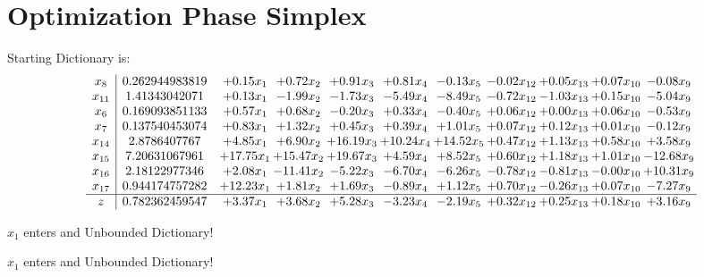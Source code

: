 \documentclass[9pt]{article}
\begin{document}
\section{Optimization Phase Simplex}
Starting Dictionary is:
\[\begin{array}{c| c c@{\hskip 2pt} c@{\hskip 2pt} c@{\hskip 2pt} c@{\hskip 2pt} c@{\hskip 2pt} c@{\hskip 2pt} c@{\hskip 2pt} c@{\hskip 2pt} c@{\hskip 2pt} }
 x_{8}   &  0.262944983819 & +  0.15 x_{1} & +  0.72 x_{2} & +  0.91 x_{3} & +  0.81 x_{4} & -0.13 x_{5} & -0.02 x_{12} & +  0.05 x_{13} & +  0.07 x_{10} & -0.08 x_{9}\\
 x_{11}   &  1.41343042071 & +  0.13 x_{1} & -1.99 x_{2} & -1.73 x_{3} & -5.49 x_{4} & -8.49 x_{5} & -0.72 x_{12} & -1.03 x_{13} & +  0.15 x_{10} & -5.04 x_{9}\\
 x_{6}   &  0.169093851133 & +  0.57 x_{1} & +  0.68 x_{2} & -0.20 x_{3} & +  0.33 x_{4} & -0.40 x_{5} & +  0.06 x_{12} & +  0.00 x_{13} & +  0.06 x_{10} & -0.53 x_{9}\\
 x_{7}   &  0.137540453074 & +  0.83 x_{1} & +  1.32 x_{2} & +  0.45 x_{3} & +  0.39 x_{4} & +  1.01 x_{5} & +  0.07 x_{12} & +  0.12 x_{13} & +  0.01 x_{10} & -0.12 x_{9}\\
 x_{14}   &  2.8786407767 & +  4.85 x_{1} & +  6.90 x_{2} & + 16.19 x_{3} & + 10.24 x_{4} & + 14.52 x_{5} & +  0.47 x_{12} & +  1.13 x_{13} & +  0.58 x_{10} & +  3.58 x_{9}\\
 x_{15}   &  7.20631067961 & + 17.75 x_{1} & + 15.47 x_{2} & + 19.67 x_{3} & +  4.59 x_{4} & +  8.52 x_{5} & +  0.60 x_{12} & +  1.18 x_{13} & +  1.01 x_{10} & -12.68 x_{9}\\
 x_{16}   &  2.18122977346 & +  2.08 x_{1} & -11.41 x_{2} & -5.22 x_{3} & -6.70 x_{4} & -6.26 x_{5} & -0.78 x_{12} & -0.81 x_{13} & -0.00 x_{10} & + 10.31 x_{9}\\
 x_{17}   &  0.944174757282 & + 12.23 x_{1} & +  1.81 x_{2} & +  1.69 x_{3} & -0.89 x_{4} & +  1.12 x_{5} & +  0.70 x_{12} & -0.26 x_{13} & +  0.07 x_{10} & -7.27 x_{9}\\
\hline
z    &  0.782362459547 & +  3.37 x_{1} & +  3.68 x_{2} & +  5.28 x_{3} & -3.23 x_{4} & -2.19 x_{5} & +  0.32 x_{12} & +  0.25 x_{13} & +  0.18 x_{10} & +  3.16 x_{9}\\
\end{array}\]


 $ x_{1} $ enters and Unbounded Dictionary!


 $ x_{1} $ enters and Unbounded Dictionary!
\end{document}
